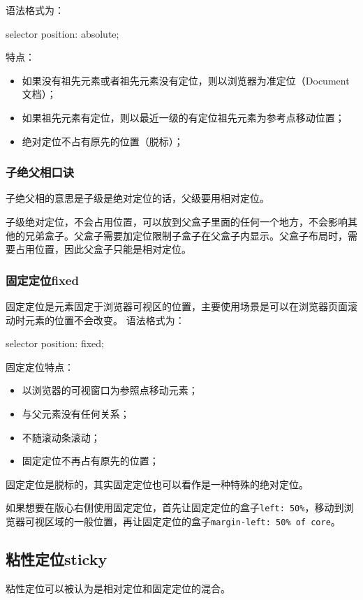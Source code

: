 语法格式为：
\begin{css}
    selector {
    position: absolute;
    }
\end{css}
特点：
\begin{itemize}
    \item 如果没有祖先元素或者祖先元素没有定位，则以浏览器为准定位（Document文档）；
    \item 如果祖先元素有定位，则以最近一级的有定位祖先元素为参考点移动位置；
    \item 绝对定位不占有原先的位置（脱标）；
\end{itemize}

\subsubsection{子绝父相口诀}

子绝父相的意思是子级是绝对定位的话，父级要用相对定位。

子级绝对定位，不会占用位置，可以放到父盒子里面的任何一个地方，不会影响其他的兄弟盒子。父盒子需要加定位限制子盒子在父盒子内显示。父盒子布局时，需要占用位置，因此父盒子只能是相对定位。

\subsubsection{固定定位fixed}
固定定位是元素固定于浏览器可视区的位置，主要使用场景是可以在浏览器页面滚动时元素的位置不会改变。
语法格式为：
\begin{css}
    selector {
    position: fixed;
    }
\end{css}

固定定位特点：
\begin{itemize}
    \item 以浏览器的可视窗口为参照点移动元素；
    \item 与父元素没有任何关系；
    \item 不随滚动条滚动；
    \item 固定定位不再占有原先的位置；
\end{itemize}

固定定位是脱标的，其实固定定位也可以看作是一种特殊的绝对定位。

如果想要在版心右侧使用固定定位，首先让固定定位的盒子\verb|left: 50%|，移动到浏览器可视区域的一般位置，再让固定定位的盒子\verb|margin-left: 50% of core|。

\subsection{粘性定位sticky}
粘性定位可以被认为是相对定位和固定定位的混合。

